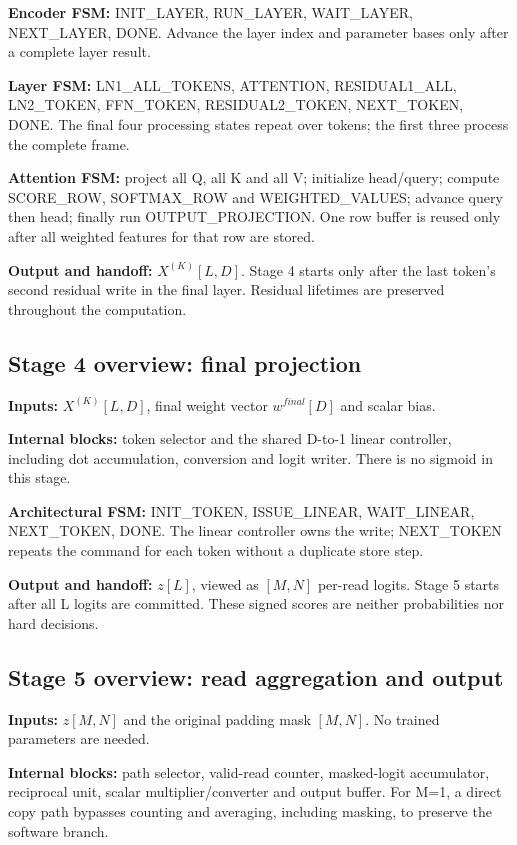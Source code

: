\textbf{Encoder FSM:} INIT\_LAYER, RUN\_LAYER, WAIT\_LAYER, NEXT\_LAYER, DONE. Advance the layer index and parameter bases only after a complete layer result.

\textbf{Layer FSM:} LN1\_ALL\_TOKENS, ATTENTION, RESIDUAL1\_ALL, LN2\_TOKEN, FFN\_TOKEN, RESIDUAL2\_TOKEN, NEXT\_TOKEN, DONE. The final four processing states repeat over tokens; the first three process the complete frame.

\textbf{Attention FSM:} project all Q, all K and all V; initialize head/query; compute SCORE\_ROW, SOFTMAX\_ROW and WEIGHTED\_VALUES; advance query then head; finally run OUTPUT\_PROJECTION. One row buffer is reused only after all weighted features for that row are stored.

\textbf{Output and handoff:} $X^{(K)}[L,D]$. Stage 4 starts only after the last token's second residual write in the final layer. Residual lifetimes are preserved throughout the computation.

\subsection{Stage 4 overview: final projection}
\textbf{Inputs:} $X^{(K)}[L,D]$, final weight vector $w^{final}[D]$ and scalar bias.

\textbf{Internal blocks:} token selector and the shared D-to-1 linear controller, including dot accumulation, conversion and logit writer. There is no sigmoid in this stage.

\textbf{Architectural FSM:} INIT\_TOKEN, ISSUE\_LINEAR, WAIT\_LINEAR, NEXT\_TOKEN, DONE. The linear controller owns the write; NEXT\_TOKEN repeats the command for each token without a duplicate store step.

\textbf{Output and handoff:} $z[L]$, viewed as $[M,N]$ per-read logits. Stage 5 starts after all L logits are committed. These signed scores are neither probabilities nor hard decisions.

\subsection{Stage 5 overview: read aggregation and output}
\textbf{Inputs:} $z[M,N]$ and the original padding mask $[M,N]$. No trained parameters are needed.

\textbf{Internal blocks:} path selector, valid-read counter, masked-logit accumulator, reciprocal unit, scalar multiplier/converter and output buffer. For M=1, a direct copy path bypasses counting and averaging, including masking, to preserve the software branch.

